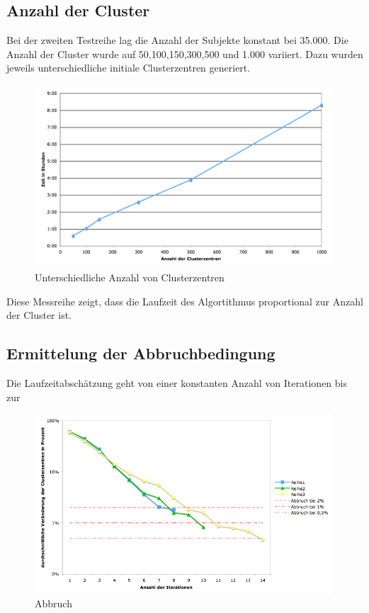\documentclass[a4paper]{llncs}
\begin{document}
\subsection{Anzahl der Cluster}
Bei der zweiten Testreihe lag die Anzahl der Subjekte konstant bei 35.000. Die Anzahl der Cluster wurde auf 50,100,150,300,500 und 1.000 variiert. Dazu wurden jeweils unterschiedliche initiale Clusterzentren generiert.
\begin{figure}[!ht]
\centering
\includegraphics[width=0.99\textwidth]{charts/clustercenters.png}
\caption{Unterschiedliche Anzahl von Clusterzentren}
\label{fig:centers}
\end{figure}
Diese Messreihe zeigt, dass die Laufzeit des Algortithmus proportional zur Anzahl der Cluster ist.

\subsection{Ermittelung der Abbruchbedingung}
Die Laufzeitabschätzung geht von einer konstanten Anzahl von Iterationen bis zur 
\begin{figure}[!ht]
\centering
\includegraphics[width=0.99\textwidth]{charts/iterations_log.png}
\caption{Abbruch}
\label{fig:iterations}
\end{figure}
\end{document}
